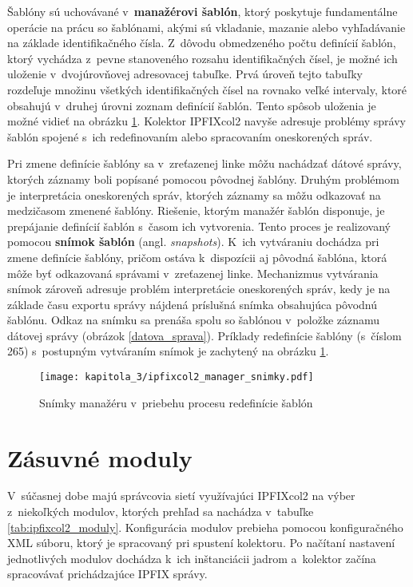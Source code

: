 Šablóny sú uchovávané v~\textbf{manažérovi šablón}, ktorý poskytuje fundamentálne operácie na prácu so šablónami, akými sú vkladanie, mazanie alebo vyhľadávanie na základe identifikačného čísla. Z~dôvodu obmedzeného počtu definícií šablón, ktorý vychádza z~pevne stanoveného rozsahu
identifikačných čísel, je možné ich uloženie v~dvojúrovňovej adresovacej tabuľke. Prvá úroveň tejto tabuľky rozdeľuje množinu všetkých identifikačných čísel na rovnako veľké intervaly, ktoré obsahujú v~druhej úrovni zoznam definícií šablón. Tento spôsob uloženia je možné
vidieť na obrázku \ref{ipfixcol2_snimky}. Kolektor IPFIXcol2 navyše adresuje problémy správy šablón spojené s~ich redefinovaním alebo spracovaním oneskorených správ.

Pri zmene definície šablóny sa v~zreťazenej linke môžu nachádzať dátové správy, ktorých záznamy boli popísané pomocou pôvodnej šablóny. Druhým problémom je interpretácia oneskorených správ, ktorých záznamy sa môžu odkazovať na medzičasom zmenené šablóny.
Riešenie, ktorým manažér šablón disponuje, je prepájanie definícií šablón s~časom ich vytvorenia. Tento proces je realizovaný pomocou \textbf{snímok šablón} (angl. \textit{snapshots}). K~ich vytváraniu dochádza pri zmene definície šablóny, pričom ostáva k~dispozícii aj pôvodná
šablóna, ktorá môže byť odkazovaná správami v~zreťazenej linke. Mechanizmus vytvárania snímok zároveň adresuje problém interpretácie oneskorených správ, kedy je na základe času exportu správy nájdená príslušná snímka obsahujúca pôvodnú šablónu. Odkaz na snímku sa prenáša spolu so šablónou
v~položke záznamu dátovej správy (obrázok \ref{datova_sprava}). Príklady redefinície šablóny (s~číslom 265) s~postupným vytváraním snímok je zachytený na obrázku \ref{ipfixcol2_snimky}.

\begin{figure}[ht]
    \centering
    \texttt{[image: kapitola\_3/ipfixcol2\_manager\_snimky.pdf]}
    \caption{Snímky manažéru v~priebehu procesu redefinície šablón}
    \label{ipfixcol2_snimky}
\end{figure}

\section{Zásuvné moduly}
\label{sec:ipfixcol2_moduly}

V~súčasnej dobe majú správcovia sietí využívajúci IPFIXcol2 na výber z~niekoľkých modulov, ktorých prehľad sa nachádza
v~tabuľke \ref{tab:ipfixcol2_moduly}. Konfigurácia modulov prebieha pomocou konfiguračného XML súboru, ktorý je spracovaný pri spustení kolektoru. Po načítaní nastavení jednotlivých modulov dochádza k~ich
inštanciácii jadrom a~kolektor začína spracovávať prichádzajúce IPFIX správy.

